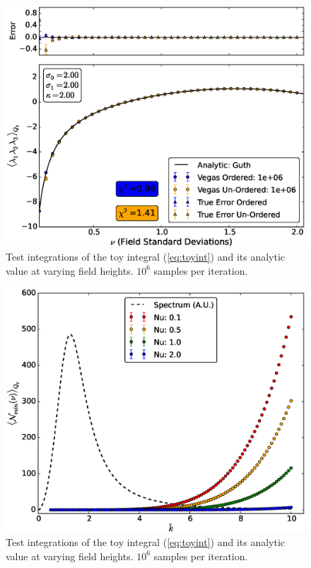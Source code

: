 \documentclass[10pt,letterpaper]{article}
\begin{document}
\begin{figure}[t] %
\centering %
\includegraphics[scale=0.45]{images/ordercomp_e6.eps} 
\caption{Test integrations of the toy integral (\ref{eq:toyint}) and its analytic value at varying field heights. $10^6$ samples per iteration.}
\label{fig:ordercomp_e6}
\end{figure}

\begin{figure}[t] %
\centering %
\includegraphics[scale=0.45]{images/spectraplot.eps} 
\caption{Test integrations of the toy integral (\ref{eq:toyint}) and its analytic value at varying field heights. $10^6$ samples per iteration.}
\label{fig:spectraplot}
\end{figure}
\end{document}
